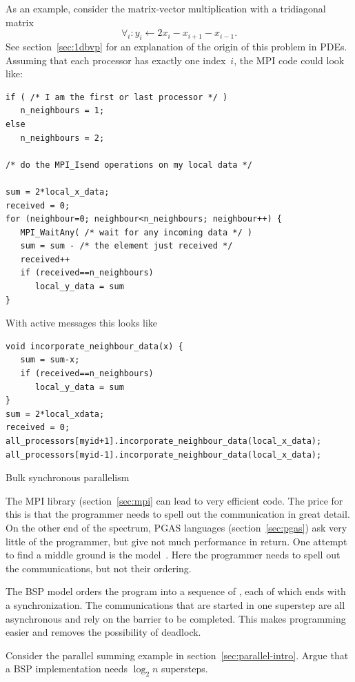 As an example, consider the matrix-vector multiplication with a
tridiagonal matrix
\[ \forall_i\colon y_i\leftarrow 2x_i-x_{i+1}-x_{i-1}. \]
See section~\ref{sec:1dbvp} for an explanation of the origin of this
problem in \acp{PDE}. Assuming that each processor has exactly one
index~$i$, the MPI code could look like:
\begin{verbatim}
if ( /* I am the first or last processor */ )
   n_neighbours = 1;
else
   n_neighbours = 2;

/* do the MPI_Isend operations on my local data */

sum = 2*local_x_data;
received = 0;
for (neighbour=0; neighbour<n_neighbours; neighbour++) {
   MPI_WaitAny( /* wait for any incoming data */ )
   sum = sum - /* the element just received */
   received++
   if (received==n_neighbours)
      local_y_data = sum
}
\end{verbatim}
With active messages this looks like
\begin{verbatim}
void incorporate_neighbour_data(x) {
   sum = sum-x;
   if (received==n_neighbours)
      local_y_data = sum
}
sum = 2*local_xdata;
received = 0;
all_processors[myid+1].incorporate_neighbour_data(local_x_data);
all_processors[myid-1].incorporate_neighbour_data(local_x_data);
\end{verbatim}

 {Bulk synchronous parallelism}
\label{sec:bsp}

The MPI library (section~\ref{sec:mpi} can lead to very efficient
code. The price for this is that the programmer needs to spell out the
communication in great detail. On the other end of the spectrum, PGAS
languages (section~\ref{sec:pgas}) ask very little of the programmer,
but give not much performance in return. One attempt to find a middle
ground is the 
model~\cite{Valiant:1990:BSP,Skillicorn96questionsand}. Here the
programmer needs to spell out the communications, but not their
ordering.

The \ac{BSP} model orders the program into a sequence of
, each of which ends with a 
synchronization.  The communications that are started in one superstep
are all asynchronous and rely on the barrier to be completed.  This
makes programming easier and removes the possibility of deadlock.

\begin{exercise}
  Consider the parallel summing example in
  section~\ref{sec:parallel-intro}. Argue that a \ac{BSP}
  implementation needs $\log_2n$ supersteps.
\end{exercise}

